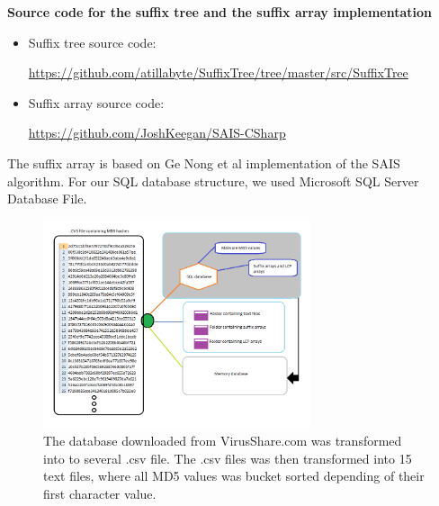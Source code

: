 \documentclass[12pt]{article} %
\begin{document}
\textbf{Source code for the suffix tree and the suffix array implementation} 
\begin{itemize}
  \item Suffix tree source code:
  \begin{sloppypar}
 \href{https://github.com/atillabyte/SuffixTree/tree/master/src/SuffixTree}{https://github.com/atillabyte/SuffixTree/tree/master/src/SuffixTree}
\end{sloppypar}
  \item Suffix array source code: 
    \begin{sloppypar}
\href{https://github.com/JoshKeegan/SAIS-CSharp}{https://github.com/JoshKeegan/SAIS-CSharp}
\end{sloppypar}
\end{itemize}
The suffix array is based on  Ge Nong et al \cite{twoeffecient} implementation of the SAIS algorithm. For our SQL database structure, we used Microsoft SQL Server Database File. \\
\begin{figure}[H]
    \centering
    \includegraphics[width=0.7\textwidth]{databasecreation}
    \captionsetup{width=0.8\textwidth}
    \caption{The database downloaded from VirusShare.com \cite{virusshare} was transformed into to several .csv file. The .csv files was then transformed into 15 text files, where all MD5 values was bucket sorted depending of their first character value.}
    \label{fig:databasecreation}
\end{figure}
\end{document}

